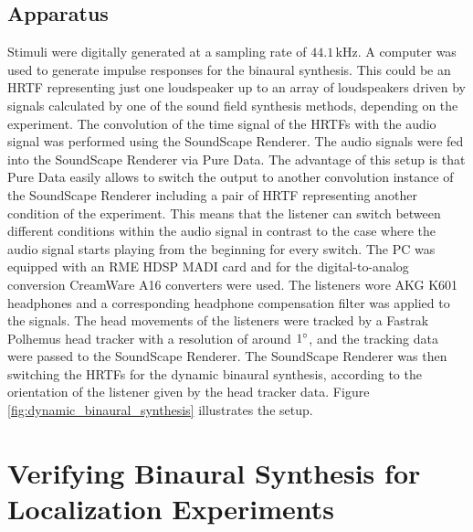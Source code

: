 \subsection{Apparatus}
\label{sec:apparatus}

Stimuli were digitally generated at a sampling rate of $44.1$\,kHz.
A computer was used to
generate impulse responses for the binaural synthesis. This could be an \ac{HRTF}
representing just one loudspeaker up to an array of loudspeakers driven by
signals calculated by one of the sound field synthesis methods,
depending on the experiment.
The convolution of the time signal of the \acp{HRTF} with
the audio signal was performed using the SoundScape
Renderer.\autocite[The \href{http://spatialaudio.net/ssr/}{\color{link}SoundScape
Renderer} is an open source software and is described in][]{Geier2008}
The audio signals were fed into the SoundScape Renderer via Pure
Data.\autocite[\href{http://puredata.info/}{\color{link}Pure Data} is an open
source software and first described in][]{Puckette1996}
The advantage of this setup is that Pure Data easily allows
to switch the output to another convolution instance of the SoundScape Renderer
including a pair of \ac{HRTF} representing another condition of the experiment. This
means that the listener can switch between different conditions within the
audio signal in contrast to the case where the audio signal starts playing from
the beginning for every switch.
The {\small PC} was equipped with an {\small RME HDSP MADI} card and for the
digital-to-analog conversion CreamWare A16 converters were used.
The listeners wore {\small AKG K601} headphones and a corresponding
headphone compensation filter was applied to the signals.
The head movements of the listeners were tracked by a Fastrak
Polhemus head tracker with a resolution of around $1^\circ$, and the tracking
data were passed to the SoundScape Renderer.
The SoundScape Renderer was then switching the \acp{HRTF} for the dynamic binaural
synthesis, according to the
orientation of the listener given by the head tracker data.
Figure\,\ref{fig:dynamic_binaural_synthesis} illustrates the setup.

\newpage


\section[Localization Experiments]{Verifying Binaural Synthesis for Localization
Experiments\autocite[Parts of this section are published
in][]{Wierstorf2012b,Wierstorf2013b}}
\label{sec:verifying_binaural_synthesis_for_localization_experiments}

